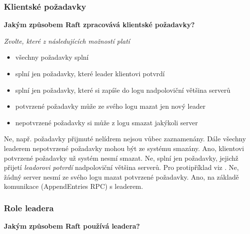 \documentclass[usenames,dvipsnames,9pt]{beamer}
\begin{document}
{
\begin{frame}[fragile]
\frametitle{Klientské požadavky}

\begin{center}
{\bf Jakým způsobem Raft zpracovává klientské požadavky?}
\end{center}

\vspace{1em}

{\em Zvolte, které z následujících možností platí}

\begin{itemize}
\item všechny požadavky splní 
\item splní jen požadavky, které leader klientovi potvrdí 
\item splní jen požadavky, které si zapíše do logu nadpoloviční většina serverů 
\item potvrzené požadavky může ze svého logu mazat jen nový leader 
\item nepotvrzené požadavky si může z logu smazat jakýkoli server 
\end{itemize}
\vspace{1em}
\begin{overprint}[\textwidth]
   Ne, např. požadavky přijmuté nelídrem nejsou vůbec zaznamenány. Dále všechny leaderem nepotvrzené požadavky mohou být ze systému smazány.
   Ano, klientovi potvrzené požadavky už systém nesmí smazat.
   Ne, splní jen požadavky, jejichž přijetí \emph{leadorovi potvrdí} nadpoloviční většina serverů. Pro protipříklad viz \href{https://www.cs.princeton.edu/courses/archive/fall16/cos418/papers/raft.pdf}{}.
   Ne, žádný server nesmí ze svého logu mazat potvrzené požadavky.
   Ano, na základě komunikace (AppendEntries RPC) s leaderem.
\end{overprint}
\end{frame}


\begin{frame}[fragile]
\frametitle{Role leadera}

\begin{center}
{\bf Jakým způsobem Raft používá leadera?}
\end{center}


\end{frame}}
\end{document}
